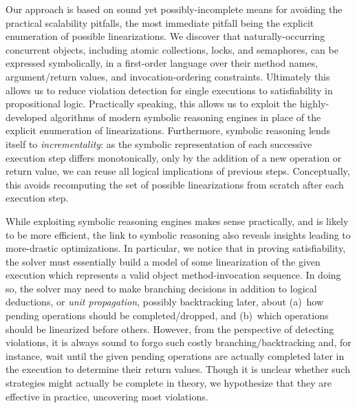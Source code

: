 Our approach is based on sound yet possibly-incomplete means for avoiding the
practical scalability pitfalls, the most immediate pitfall being the explicit
enumeration of possible linearizations. We discover that naturally-occurring
concurrent objects, including atomic collections, locks, and semaphores, can be
expressed symbolically, in a first-order language over their method names,
argument/return values, and invocation-ordering constraints. Ultimately this
allows us to reduce violation detection for single executions to satisfiability
in propositional logic. Practically speaking, this allows us to exploit the
highly-developed algorithms of modern symbolic reasoning engines in place of
the explicit enumeration of linearizations. Furthermore, symbolic reasoning
lends itself to \emph{incrementality}: as the symbolic representation of each
successive execution step differs monotonically, only by the addition of a new
operation or return value, we can reuse all logical implications of previous
steps. Conceptually, this avoids recomputing the set of possible linearizations
from scratch after each execution step.

While exploiting symbolic reasoning engines makes sense practically, and is
likely to be more efficient, the link to symbolic reasoning also reveals
insights leading to more-drastic optimizations. In particular, we notice that
in proving satisfiability, the solver must essentially build a model of some
linearization of the given execution which represents a valid object
method-invocation sequence. In doing so, the solver may need to make branching
decisions in addition to logical deductions, or \emph{unit propagation},
possibly backtracking later, about (a)~how pending operations should be
completed/dropped, and (b)~which operations should be linearized before others.
However, from the perspective of detecting violations, it is always sound to
forgo such costly branching/backtracking and, for instance, wait until the
given pending operations are actually completed later in the execution to
determine their return values. Though it is unclear whether such strategies
might actually be complete in theory, we hypothesize that they are effective in
practice, uncovering most violations.

